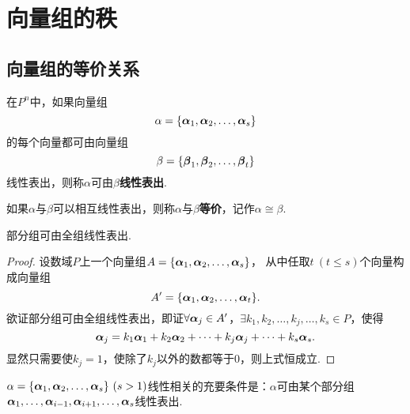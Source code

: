 \section{向量组的秩}
\subsection{向量组的等价关系}
\begin{definition}
在\(P^n\)中，如果向量组\[
\alpha=\{\boldsymbol{\alpha}_1,\boldsymbol{\alpha}_2,\dotsc,\boldsymbol{\alpha}_s\}
\]的每个向量都可由向量组\[
\beta=\{\boldsymbol{\beta}_1,\boldsymbol{\beta}_2,\dotsc,\boldsymbol{\beta}_t\}
\]线性表出，则称\(\alpha\)可由\(\beta\)\textbf{线性表出}.

如果\(\alpha\)与\(\beta\)可以相互线性表出，则称\(\alpha\)与\(\beta\)\textbf{等价}，记作\(\alpha \cong \beta\).
\end{definition}

\begin{theorem}
部分组可由全组线性表出.
\begin{proof}
设数域\(P\)上一个向量组\(A=\{\boldsymbol{\alpha}_1,\boldsymbol{\alpha}_2,\dotsc,\boldsymbol{\alpha}_s\}\)，%
从中任取\(t\ (t \leqslant s)\)个向量构成向量组\[
A'=\{ \boldsymbol{\alpha}_1, \boldsymbol{\alpha}_2, \dotsc, \boldsymbol{\alpha}_t \}.
\]欲证部分组可由全组线性表出，即证\(\forall \boldsymbol{\alpha}_j \in A'\)，\(\exists k_1,k_2,\dotsc,k_j,\dotsc,k_s \in P\)，使得\[
\boldsymbol{\alpha}_j = k_1 \boldsymbol{\alpha}_1 + k_2 \boldsymbol{\alpha}_2 + \dotsb + k_j \boldsymbol{\alpha}_j + \dotsb + k_s \boldsymbol{\alpha}_s.
\]
显然只需要使\(k_j = 1\)，使除了\(k_j\)以外的数都等于0，则上式恒成立.
\end{proof}
\end{theorem}

\begin{theorem}
\(\alpha=\{\mat{\alpha}_1,\mat{\alpha}_2,\dotsc,\mat{\alpha}_s\}\ (s>1)\)线性相关的充要条件是：\(\alpha\)可由某个部分组\(\boldsymbol{\alpha}_1,\dotsc,\boldsymbol{\alpha}_{i-1},\boldsymbol{\alpha}_{i+1},\dotsc,\boldsymbol{\alpha}_s\)线性表出.
\end{theorem}

